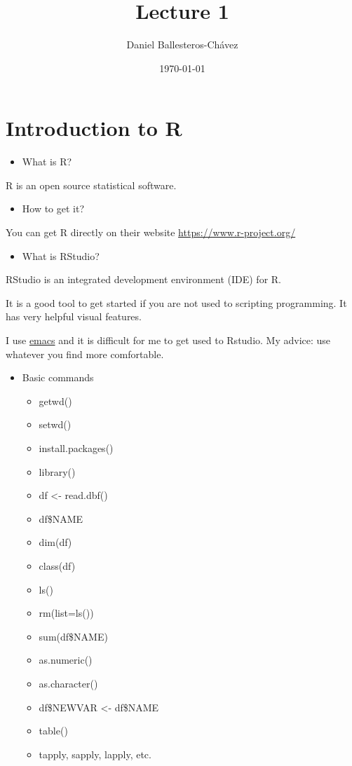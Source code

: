 \documentclass[11pt]{article}
\author{Daniel Ballesteros-Chávez}
\date{\today}
\title{Lecture 1}
\begin{document}
\maketitle
\tableofcontents




\section{Introduction to R}
\label{sec:org04ada71}

\begin{itemize}
\item What is R?
\end{itemize}

R is an open source statistical software.

\begin{itemize}
\item How to get it?
\end{itemize}

You can get R directly on their website \url{https://www.r-project.org/}

\begin{itemize}
\item What is RStudio?
\end{itemize}

RStudio is an integrated development environment (IDE) for R.

It is a good tool to get started if you are not used to scripting
programming. It has very helpful visual features.

I use \href{https://www.gnu.org/software/emacs/}{emacs} and it is difficult for me to get used to Rstudio. My
advice: use whatever you find more comfortable.



\begin{itemize}
\item Basic commands
\begin{itemize}
\item getwd()
\item setwd()
\item install.packages()
\item library()
\item df <- read.dbf()
\item df\$NAME
\item dim(df)
\item class(df)
\item ls()
\item rm(list=ls())
\item sum(df\$NAME)
\item as.numeric()
\item as.character()
\item df\$NEWVAR <- df\$NAME
\item table()
\item tapply, sapply, lapply, etc.
\end{itemize}
\end{itemize}
\end{document}
